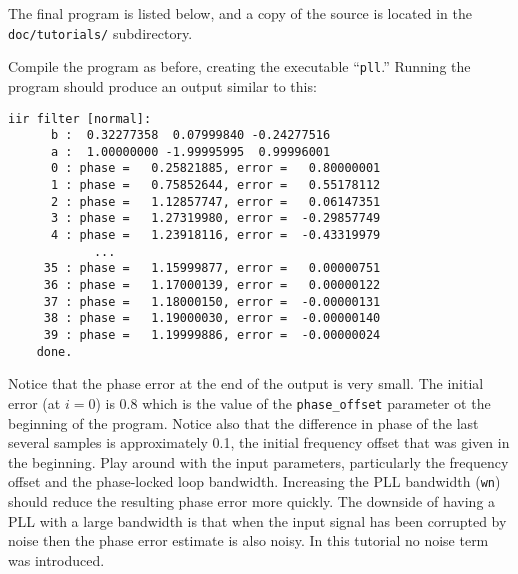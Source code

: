 The final program is listed below,
and a copy of the source is located in the {\tt doc/tutorials/}
subdirectory.
%

%
Compile the program as before, creating the executable ``{\tt pll}.''
Running the program should produce an output similar to this:
\begin{Verbatim}[fontsize=\small]
    iir filter [normal]:
      b :  0.32277358  0.07999840 -0.24277516
      a :  1.00000000 -1.99995995  0.99996001
      0 : phase =   0.25821885, error =   0.80000001
      1 : phase =   0.75852644, error =   0.55178112
      2 : phase =   1.12857747, error =   0.06147351
      3 : phase =   1.27319980, error =  -0.29857749
      4 : phase =   1.23918116, error =  -0.43319979
            ...
     35 : phase =   1.15999877, error =   0.00000751
     36 : phase =   1.17000139, error =   0.00000122
     37 : phase =   1.18000150, error =  -0.00000131
     38 : phase =   1.19000030, error =  -0.00000140
     39 : phase =   1.19999886, error =  -0.00000024
    done.
\end{Verbatim}
%
Notice that the phase error at the end of the output is very small.
The initial error (at $i=0$) is 0.8 which is the value of the
{\tt phase\_offset} parameter ot the beginning of the program.
Notice also that the difference in phase of the last several samples is
approximately 0.1, the initial frequency offset that was given in the
beginning.
Play around with the input parameters, particularly the frequency offset
and the phase-locked loop bandwidth.
Increasing the PLL bandwidth ({\tt wn}) should reduce the resulting
phase error more quickly.
The downside of having a PLL with a large bandwidth is that when the
input signal has been corrupted by noise then the phase error estimate
is also noisy.
In this tutorial no noise term was introduced. %

